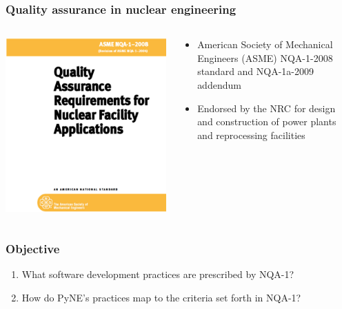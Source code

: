 \documentclass[12pt]{beamer}
\begin{document}
\begin{frame}[fragile]
\frametitle{Quality assurance in nuclear engineering}

\begin{columns}[T]
\begin{column}{0.5\textwidth}
\includegraphics[width=\textwidth]{figures/nqa-1-2008.png}
\end{column}
\begin{column}{0.5\textwidth}
\begin{itemize}
\item{American Society of Mechanical Engineers (ASME)
NQA-1-2008 \cite{nqa} standard and NQA-1a-2009 \cite{add} addendum}
\item{Endorsed by the NRC for design and construction of power plants and reprocessing facilities}
\end{itemize}
\end{column}
\end{columns}


\end{frame}
\begin{frame}[fragile]
\frametitle{Objective}

\begin{enumerate}
\item{What software development practices are prescribed by NQA-1?}
\item{How do PyNE's practices map to the criteria set forth in NQA-1?}
\end{enumerate}

\end{frame}
\end{document}
